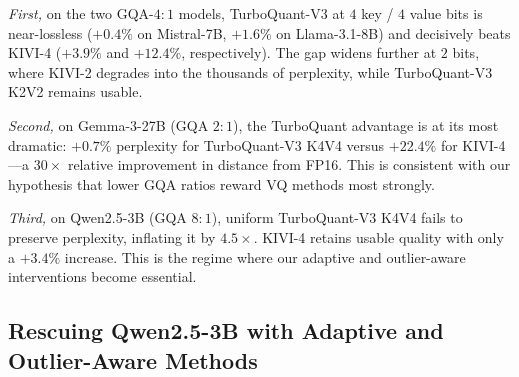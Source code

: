 \documentclass[11pt]{article}
\begin{document}
\begin{table}[t]
\centering
\caption{WikiText-2 perplexity across four models and KV cache compression methods. Each cell shows the perplexity and relative change from FP16. ``Collapse'' indicates PPL exceeds $100$. GQA column gives the query-to-KV-head ratio.}
\label{tab:main-ppl}
\small

\end{table}

\emph{First,} on the two GQA-$4{:}1$ models, TurboQuant-V3 at $4$ key / $4$ value bits is near-lossless ($+0.4\%$ on Mistral-7B, $+1.6\%$ on Llama-3.1-8B) and decisively beats KIVI-4 ($+3.9\%$ and $+12.4\%$, respectively). The gap widens further at $2$ bits, where KIVI-2 degrades into the thousands of perplexity, while TurboQuant-V3 K2V2 remains usable.

\emph{Second,} on Gemma-3-27B (GQA $2{:}1$), the TurboQuant advantage is at its most dramatic: $+0.7\%$ perplexity for TurboQuant-V3 K4V4 versus $+22.4\%$ for KIVI-4---a $30\times$ relative improvement in distance from FP16. This is consistent with our hypothesis that lower GQA ratios reward VQ methods most strongly.

\emph{Third,} on Qwen2.5-3B (GQA $8{:}1$), uniform TurboQuant-V3 K4V4 fails to preserve perplexity, inflating it by $4.5\times$. KIVI-4 retains usable quality with only a $+3.4\%$ increase. This is the regime where our adaptive and outlier-aware interventions become essential.

\subsection{Rescuing Qwen2.5-3B with Adaptive and Outlier-Aware Methods}
\label{sec:qwen-rescue}

\begin{table}[t]
\centering
\caption{Methods evaluated on Qwen2.5-3B. The ``Avg bits'' column reports effective per-element storage, including FP16 overhead for outlier channels. Uniform TurboQuant-V3 at any bit-width below $6$ collapses; adaptive allocation and outlier-aware grouping recover near-lossless quality.}
\label{tab:qwen-rescue}
\small

\end{table}
\end{document}
